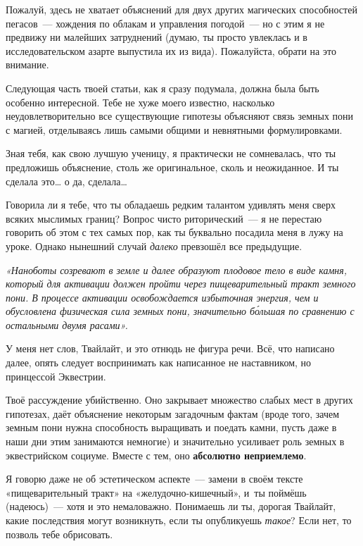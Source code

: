 \documentclass[fontsize=11pt,a5paper,titlepage=firstcover]{scrbook}
\begin{document}
Пожалуй, здесь не хватает объяснений для двух других магических способностей пегасов~--- хождения по облакам и управления погодой~--- но с этим я не предвижу ни малейших затруднений (думаю, ты просто увлеклась и в исследовательском азарте выпустила их из вида). Пожалуйста, обрати на это внимание.

Следующая часть твоей статьи, как я сразу подумала, должна была быть особенно интересной. Тебе не хуже моего известно, насколько неудовлетворительно все существующие гипотезы объясняют связь земных пони с магией, отделываясь лишь самыми общими и невнятными формулировками.

Зная тебя, как свою лучшую ученицу, я практически не сомневалась, что ты предложишь объяснение, столь же оригинальное, сколь и неожиданное. И ты сделала это{\ldots} о да, сделала{\ldots}

Говорила ли я тебе, что ты обладаешь редким талантом удивлять меня сверх всяких мыслимых границ? Вопрос чисто риторический~--- я не перестаю говорить об этом с тех самых пор, как ты буквально посадила меня в лужу на уроке. Однако нынешний случай \emph{далеко} превзошёл все предыдущие.

\emph{«Наноботы созревают в земле и далее образуют плодовое тело в виде камня, который для активации должен пройти через пищеварительный тракт земного пони. В процессе активации освобождается избыточная энергия, чем и обусловлена физическая сила земных пони, значительно бо́льшая по сравнению с остальными двумя расами».}

У меня нет слов, Твайлайт, и это отнюдь не фигура речи. Всё, что написано далее, опять следует воспринимать как написанное не наставником, но принцессой Эквестрии.

Твоё рассуждение убийственно. Оно закрывает множество слабых мест в других гипотезах, даёт объяснение некоторым загадочным фактам (вроде того, зачем земным пони нужна способность выращивать и поедать камни, пусть даже в наши дни этим занимаются немногие) и значительно усиливает роль земных в эквестрийском социуме. Вместе с тем, оно \textbf{абсолютно неприемлемо}.

Я говорю даже не об эстетическом аспекте~--- замени в своём тексте «пищеварительный тракт» на «желудочно-кишечный», и~ты поймёшь (надеюсь)~--- хотя и это немаловажно. Понимаешь ли ты, дорогая Твайлайт, какие последствия могут возникнуть, если ты опубликуешь \emph{такое}? Если нет, то позволь тебе обрисовать.
\end{document}
